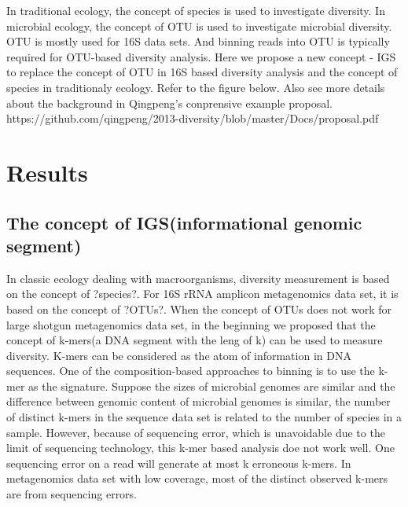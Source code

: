 \documentclass{article}
\begin{document}
In traditional ecology, the concept of species is used to investigate diversity. In microbial ecology, the concept of OTU is used to investigate microbial diversity. OTU is mostly used for 16S data sets. And binning reads into OTU is typically required for OTU-based diversity analysis. Here we propose a new concept - IGS to replace the concept of OTU in 16S based diversity analysis and the concept of species in traditionaly ecology. Refer to the figure below. Also see more details about the background in Qingpeng's conprensive example proposal. https://github.com/qingpeng/2013-diversity/blob/master/Docs/proposal.pdf



\section{Results}



\subsection{The concept of IGS(informational genomic segment)}

In classic ecology dealing with macroorganisms, diversity measurement is based on the concept of ?species?. For 16S rRNA amplicon metagenomics data set, it is based on the concept of ?OTUs?. When the concept of OTUs does not work for large shotgun metagenomics data set, in the beginning we proposed that the concept of k-mers(a DNA segment with the leng of k) can be used to measure diversity. K-mers can be considered as the atom of information in DNA sequences. One of the composition-based approaches to binning is to use the k-mer as the signature. Suppose the sizes of microbial genomes are similar and the difference between genomic content of microbial genomes is similar, the number of distinct k-mers in the sequence data set is related to the number of species in a sample. However, because of sequencing error, which is unavoidable due to the limit of sequencing technology, this k-mer based analysis doe not work well. One sequencing error on a read will generate at most k erroneous k-mers. In metagenomics data set with low coverage, most of the distinct observed k-mers are from sequencing errors.
\end{document}
